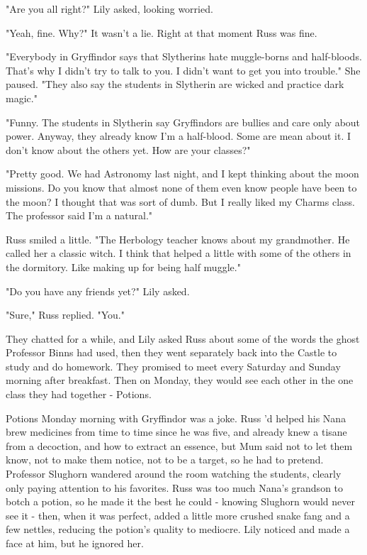 \documentclass[a4paper,11pt]{article}
\begin{document}
"Are you all right?" Lily asked, looking worried.

"Yeah, fine. Why?" It wasn't a lie. Right at that moment Russ was fine.

"Everybody in Gryffindor says that Slytherins hate muggle-borns and half-bloods. That's why I didn't try to talk to you. I didn't want to get you into trouble." She paused. "They also say the students in Slytherin are wicked and practice dark magic."

"Funny. The students in Slytherin say Gryffindors are bullies and care only about power. Anyway, they already know I'm a half-blood. Some are mean about it. I don't know about the others yet. How are your classes?"

"Pretty good. We had Astronomy last night, and I kept thinking about the moon missions. Do you know that almost none of them even know people have been to the moon? I thought that was sort of dumb. But I really liked my Charms class. The professor said I'm a natural."

Russ smiled a little. "The Herbology teacher knows about my grandmother. He called her a classic witch. I think that helped a little with some of the others in the dormitory. Like making up for being half muggle."

"Do you have any friends yet?" Lily asked.

"Sure," Russ replied. "You."

They chatted for a while, and Lily asked Russ about some of the words the ghost Professor Binns had used, then they went separately back into the Castle to study and do homework. They promised to meet every Saturday and Sunday morning after breakfast. Then on Monday, they would see each other in the one class they had together - Potions.

Potions Monday morning with Gryffindor was a joke. Russ 'd helped his Nana brew medicines from time to time since he was five, and already knew a tisane from a decoction, and how to extract an essence, but Mum said not to let them know, not to make them notice, not to be a target, so he had to pretend. Professor Slughorn wandered around the room watching the students, clearly only paying attention to his favorites. Russ was too much Nana's grandson to botch a potion, so he made it the best he could - knowing Slughorn would never see it - then, when it was perfect, added a little more crushed snake fang and a few nettles, reducing the potion's quality to mediocre. Lily noticed and made a face at him, but he ignored her.
\end{document}
